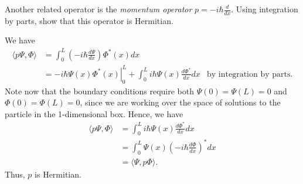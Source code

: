 \documentclass[12pt]{article} %
\newcommand{\innprod}[2]{\langle #1, #2 \rangle}
\begin{document}
\newpage
\begin{problem}
	Another related operator is the \emph{momentum operator} $p = -i\hbar \frac{d}{dx}$. Using integration by parts, show that this operator is Hermitian.
\end{problem}
\begin{solution}
We have
\begin{align*}
	\innprod{p \Psi}{\Phi} &= \int_0^L \left(-i\hbar \frac{d \Psi}{dx}\right)\Phi^*(x)dx\\
	&= \left.-i\hbar \Psi(x)\Phi^*(x)  \right\vert_0^L + \int_0^L i\hbar \Psi(x) \frac{d\Phi^*}{dx}dx & \textrm{by integration by parts}.
\end{align*}
Note now that the boundary conditions require both $\Psi(0)=\Psi(L)=0$ and $\Phi(0)=\Phi(L)=0$, since we are working over the space of solutions to the particle in the 1-dimensional box.  Hence, we have
\begin{align*}
	\innprod{p\Psi}{\Phi} &= \int_0^L i\hbar \Psi(x) \frac{d\Phi^*}{dx}dx\\
	&= \int_0^L \Psi(x)\left(-i\hbar \frac{d\Phi}{dx}\right)^* dx \\
	&= \innprod{\Psi}{p\Phi}.
\end{align*}
Thus, $p$ is Hermitian.
\end{solution}
\end{document}
